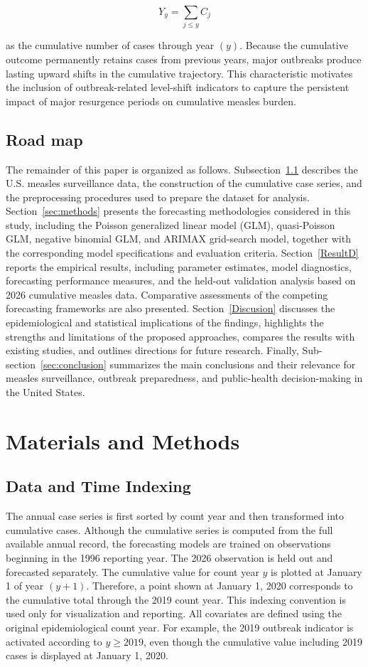 \documentclass[utf8]{FrontiersinHarvard} %
\begin{document}
\[
Y_y=\sum_{j\leq y} C_j
\]

as the cumulative number of cases through year $(y).$ Because the cumulative outcome permanently retains cases from previous years, major outbreaks produce lasting upward shifts in the cumulative trajectory. This characteristic motivates the inclusion of outbreak-related level-shift indicators to capture the persistent impact of major resurgence periods on cumulative measles burden.
\subsection{Road map}
The remainder of this paper is organized as follows. Subsection~\ref{sec:data} describes the U.S. measles surveillance data, the construction of the cumulative case series, and the preprocessing procedures used to prepare the dataset for analysis. Section~\ref{sec:methods} presents the forecasting methodologies considered in this study, including the Poisson generalized linear model (GLM), quasi-Poisson GLM, negative binomial GLM, and ARIMAX grid-search model, together with the corresponding model specifications and evaluation criteria. Section~\ref{ResultD} reports the empirical results, including parameter estimates, model diagnostics, forecasting performance measures, and the held-out validation analysis based on 2026 cumulative measles data. Comparative assessments of the competing forecasting frameworks are also presented. Section~\ref{Discusion} discusses the epidemiological and statistical implications of the findings, highlights the strengths and limitations of the proposed approaches, compares the results with existing studies, and outlines directions for future research. Finally, Sub-section~\ref{sec:conclusion} summarizes the main conclusions and their relevance for measles surveillance, outbreak preparedness, and public-health decision-making in the United States.



\section{Materials and Methods}
\subsection{Data and Time Indexing}\label{sec:data}
The annual case series is first sorted by count year and then transformed into cumulative cases. Although the cumulative series is computed from the full available annual record, the forecasting models are trained on observations beginning in the 1996 reporting year. The 2026 observation is held out and forecasted separately. The cumulative value for count year \(y\) is plotted at January 1 of year \((y+1)\). Therefore, a point shown at January 1, 2020 corresponds to the cumulative total through the 2019 count year. This indexing convention is used only for visualization and reporting. All covariates are defined using the original epidemiological count year. For example, the 2019 outbreak indicator is activated according to \(y\geq 2019\), even though the cumulative value including 2019 cases is displayed at January 1, 2020.
\end{document}
